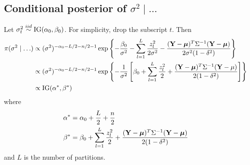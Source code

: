 \subsection*{Conditional posterior of $\sigma^2 \mid \ldots$}\label{s:sigpost}
Let $\sigma_t^2 \stackrel{iid}{\sim} \mbox{IG}(\alpha_0, \beta_0)$. For simplicity, drop the subscript $t$. Then
\begin{align*}
    \pi(\sigma^2 \mid \ldots) & \propto (\sigma^2)^{ -\alpha_0 - L / 2 - n / 2 - 1} \exp \left\{ -\frac{\beta_0}{\sigma^2} - \sum_{l=1}^L \frac{ z_l^2 }{2 \sigma^2} - \frac{ (\mbox{\bf Y} - \mbox{\boldmath $\mu$})^T \Sigma^{-1} (\mbox{\bf Y} - \mbox{\boldmath $\mu$}) }{2 \sigma^2 (1 - \delta^2)} \right\} \\
    & \propto (\sigma^2)^{ -\alpha_0 - L / 2 - n / 2 - 1} \exp \left\{ - \frac{ 1 }{ \sigma^2 } \left[\beta_0 + \sum_{ l = 1 }^{ L}\frac{ z_{l}^2 }{ 2 } + \frac{ (\mbox{\bf Y} - \mbox{\boldmath $\mu$})^T \Sigma^{-1} (\mbox{\bf Y} - \mu) }{ 2 (1 - \delta^2)} \right] \right\} \\
    & \propto \mbox{IG} (\alpha^*, \beta^*)
\end{align*}
where
\begin{align*}
    \alpha^* &= \alpha_0 + \frac{L}{2} + \frac{n}{2} \\
    \beta^* &= \beta_0 + \sum_{ l = 1 }^{ L}\frac{ z_{l}^2 }{ 2 } + \frac{ (\mbox{\bf Y} - \mbox{\boldmath $\mu$})^T \Sigma^{-1} (\mbox{\bf Y} - \mbox{\boldmath $\mu$}) }{ 2 (1 - \delta^2)}
\end{align*}
and $L$ is the number of partitions.
